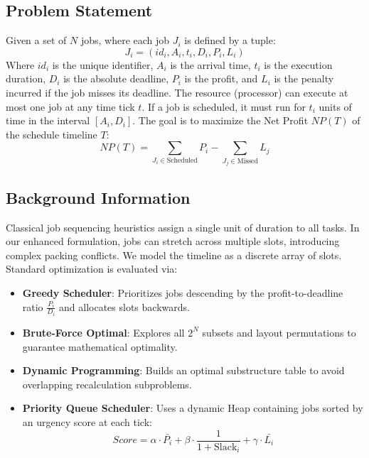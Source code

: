 \documentclass[12pt,a4paper]{article}
\begin{document}
\subsection{Problem Statement}
Given a set of $N$ jobs, where each job $J_i$ is defined by a tuple:
\begin{equation}
J_i = (id_i, A_i, t_i, D_i, P_i, L_i)
\end{equation}
Where $id_i$ is the unique identifier, $A_i$ is the arrival time, $t_i$ is the execution duration, $D_i$ is the absolute deadline, $P_i$ is the profit, and $L_i$ is the penalty incurred if the job misses its deadline. The resource (processor) can execute at most one job at any time tick $t$. If a job is scheduled, it must run for $t_i$ units of time in the interval $[A_i, D_i]$. The goal is to maximize the Net Profit $NP(T)$ of the schedule timeline $T$:
\begin{equation}
NP(T) = \sum_{J_i \in \text{Scheduled}} P_i - \sum_{J_j \in \text{Missed}} L_j
\end{equation}

\subsection{Background Information}
Classical job sequencing heuristics assign a single unit of duration to all tasks. In our enhanced formulation, jobs can stretch across multiple slots, introducing complex packing conflicts. We model the timeline as a discrete array of slots. Standard optimization is evaluated via:
\begin{itemize}
    \item \textbf{Greedy Scheduler}: Prioritizes jobs descending by the profit-to-deadline ratio $\frac{P_i}{D_i}$ and allocates slots backwards.
    \item \textbf{Brute-Force Optimal}: Explores all $2^N$ subsets and layout permutations to guarantee mathematical optimality.
    \item \textbf{Dynamic Programming}: Builds an optimal substructure table to avoid overlapping recalculation subproblems.
    \item \textbf{Priority Queue Scheduler}: Uses a dynamic Heap containing jobs sorted by an urgency score at each tick:
    \begin{equation}
    Score = \alpha \cdot \bar{P_i} + \beta \cdot \frac{1}{1 + \text{Slack}_i} + \gamma \cdot \bar{L_i}
    \end{equation}
\end{itemize}
\end{document}
